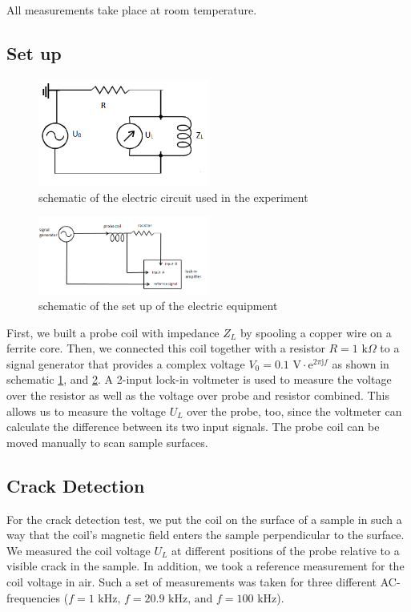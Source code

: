 All measurements take place at room temperature.
\subsection{Set up}
\begin{figure}[htbp]
	\centering
		\includegraphics[width=0.50\textwidth]{img/circuit}
	\caption{schematic of the electric circuit used in the experiment\cite{coilImpedance}}
	\label{fig:circuit}
\end{figure}

\begin{figure}[htbp]
	\centering
		\includegraphics[width=0.50\textwidth]{img/setup}
	\caption{schematic of the set up of the electric equipment}
	\label{fig:setup}
\end{figure}
First, we built a probe coil with impedance $Z_L$ by spooling a copper wire on a ferrite core. Then, we connected this coil together with a resistor $R=1\text{ k}\Omega$ to a signal generator that provides a complex voltage $V_0=0.1\text{ V}\cdot\text{e}^{2\pi\text{j}f}$ as shown in schematic \ref{fig:circuit}, and \ref{fig:setup}. A 2-input lock-in voltmeter is used to measure the voltage over the resistor as well as the voltage over probe and resistor combined. This allows us to measure the voltage $U_L$ over the probe, too, since the voltmeter can calculate the difference between its two input signals. The probe coil can be moved manually to scan sample surfaces. 

\subsection{Crack Detection}
For the crack detection test, we put the coil on the surface of a sample in such a way that the coil's magnetic field enters the sample perpendicular to the surface. We measured the coil voltage $U_L$ at different positions of the probe relative to a visible crack in the sample. In addition, we took a reference measurement for the coil voltage in air. Such a set of measurements was taken for three different AC-frequencies ($f=1\text{ kHz, }f=20.9\text{ kHz, and }f=100$ kHz).

